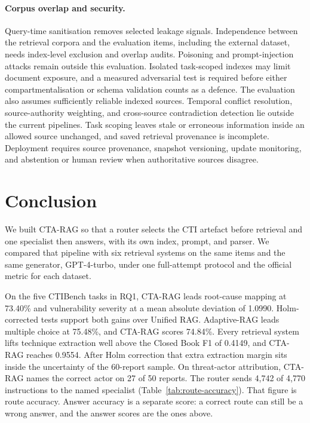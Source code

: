 \documentclass[5p,times,authoryear]{elsarticle}
\begin{document}
\paragraph{Corpus overlap and security.}
Query-time sanitisation removes selected leakage signals. Independence
between the retrieval corpora and the evaluation items, including the
external dataset, needs index-level exclusion and overlap audits. Poisoning
and prompt-injection attacks remain outside this evaluation. Isolated
task-scoped indexes may limit document exposure, and a measured adversarial
test is required before either compartmentalisation or schema validation
counts as a defence.
The evaluation also assumes sufficiently reliable indexed sources. Temporal
conflict resolution, source-authority weighting, and cross-source
contradiction detection lie outside the current pipelines. Task scoping
leaves stale or erroneous information inside an allowed source unchanged,
and saved retrieval provenance is incomplete. Deployment requires source provenance,
snapshot versioning, update monitoring, and abstention or human review when
authoritative sources disagree.

\section{Conclusion}\label{sec:conclusion}

We built CTA-RAG so that a router selects the CTI artefact before retrieval and one specialist then answers, with its own index, prompt, and parser. We compared that pipeline with six retrieval systems on the same items and the same generator, GPT-4-turbo, under one full-attempt protocol and the official metric for each dataset.

On the five CTIBench tasks in RQ1, CTA-RAG leads root-cause mapping at 73.40\% and vulnerability severity at a mean absolute deviation of 1.0990. Holm-corrected tests support both gains over Unified RAG. Adaptive-RAG leads multiple choice at 75.48\%, and CTA-RAG scores 74.84\%. Every retrieval system lifts technique extraction well above the Closed Book F1 of 0.4149, and CTA-RAG reaches 0.9554. After Holm correction that extra extraction margin sits inside the uncertainty of the 60-report sample. On threat-actor attribution, CTA-RAG names the correct actor on 27 of 50 reports. The router sends 4,742 of 4,770 instructions to the named specialist (Table~\ref{tab:route-accuracy}). That figure is route accuracy. Answer accuracy is a separate score: a correct route can still be a wrong answer, and the answer scores are the ones above.
\end{document}
